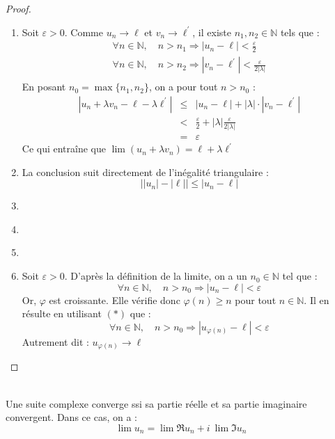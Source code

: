     \begin{proof}
        \ \\
        \begin{enumerate}[label=(\roman*)]
            \item Soit \(\varepsilon>0\). Comme \(u_n\to\ell \) et \(v_n \to \ell^{\prime}\), il existe \(n_1, n_2 \in \mathbb{N}\) tels que :
            \[
                \begin{array}{l}
                    \forall n \in \mathbb{N},\quad n > n_1 \Rightarrow |u_n - \ell| < \frac{\varepsilon}{2}\\
                    \forall n \in \mathbb{N},\quad n > n_2 \Rightarrow |v_n - \ell^{\prime}| < \frac{\varepsilon}{2|\lambda|}\\
                \end{array}    
            \]
            En posant \(n_0 = \max{\{n_1, n_2\}}\), on a pour tout \(n>n_0\) :
            \[
                \begin{array}{lcl}
                    |u_n + \lambda v_n - \ell - \lambda \ell^{\prime}| &\le& |u_n  - \ell| + |\lambda|\cdot|v_n - \ell^{\prime}|\\
                     &<& \frac{\varepsilon}{2} + |\lambda|\frac{\varepsilon}{2|\lambda|}\\
                     &=& \varepsilon
                \end{array}
            \]
            Ce qui entraîne que \(\lim (u_n + \lambda v_n) = \ell + \lambda \ell^{\prime}\) 
            
            \item La conclusion suit directement de l'inégalité triangulaire : \[\Big| |u_n| - |\ell| \Big| \le |u_n - \ell|\]
            \item \ 
            \item \ 
            \item \ 
            \item Soit \(\varepsilon > 0\). D'après la définition de la limite, on a un  \(n_0\in\mathbb{N}\) tel que : 
            \begin{equation*}
                \tag*{\((\ast)\)}
                \forall n \in \mathbb{N}, \quad n > n_0 \Rightarrow |u_n - \ell| < \varepsilon 
            \end{equation*}
            Or, \(\varphi\) est croissante. Elle vérifie donc \(\varphi(n) \ge n\) pour tout \(n\in\mathbb{N}\). Il en résulte en utilisant \((\ast)\) que :
            \[
                \forall n \in \mathbb{N}, \quad n > n_0 \Rightarrow |u_{\varphi(n)} - \ell| < \varepsilon     
            \]
            Autrement dit : \(u_{\varphi(n)} \to\ell \)
        \end{enumerate}
    \end{proof}

    \begin{corollary}\ \\
        Une suite complexe converge ssi sa partie réelle et sa partie imaginaire convergent. Dans ce cas, on a :
        \[\lim u_n = \lim \Re{u_n} + i\ \lim\Im{u_n}\] 
    \end{corollary}